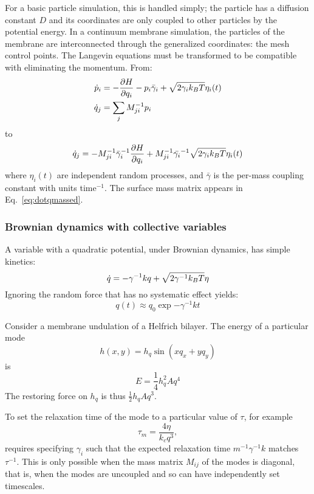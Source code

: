 For a basic particle simulation, this is handled simply; the particle has a diffusion constant $D$ and its coordinates are only coupled to other particles by the potential energy.
In a continuum membrane simulation, the particles of the membrane are interconnected through the generalized coordinates: the mesh control points.
The Langevin equations must be transformed to be compatible with eliminating the momentum.
From:
\begin{align}
\dot{p}_i &= -\frac{\partial H}{\partial q_i} -p_i \bar{\gamma}_i + \sqrt{2 \gamma_i k_B T} \eta_i(t) \nonumber \\
\dot{q}_j &= \sum_j M_{ji}^{-1} p_i
\end{align}
to
\begin{equation}
\dot{q}_j = -M_{ji}^{-1} \bar{\gamma}_i^{-1} \frac{\partial H}{\partial q_i} + M_{ji}^{-1}\bar{\gamma_i}^{-1}\sqrt{2 \gamma_i k_B T}\eta_i(t)
\label{eq:dotqmassed}
\end{equation}
where $\eta_i(t)$ are independent random processes, and $\bar{\gamma}$ is the per-mass coupling constant with units time$^{-1}$.
The surface mass matrix appears in Eq.~\ref{eq:dotqmassed}. 



\subsubsection{Brownian dynamics with collective variables}


A variable with a quadratic potential, under Brownian dynamics, has simple kinetics:
\begin{equation}
\dot{q} = -\gamma^{-1} k q + \sqrt{ 2 \gamma^{-1} k_B T } \eta
\end{equation}
Ignoring the random force that has no systematic effect yields:
\begin{equation}
q(t) \approx q_0 \exp{-\gamma^{-1} k t}
\end{equation}

Consider a membrane undulation of a Helfrich bilayer.
The energy of a particular mode
\begin{equation}
h(x,y) = h_q \sin(x q_x + y q_y )
\end{equation}
is
\begin{equation}
E = \frac{1}{4} h_q^2 A q^4
\end{equation}
The restoring force on $h_q$ is thus $\frac{1}{2} h_q A q^3$.

To set the relaxation time of the mode to a particular value of $\tau$, for example
\begin{equation}
\tau_m = \frac{4 \eta}{k_c q^3},
\end{equation}
requires specifying $\gamma_i$ such that the expected relaxation time $m^{-1} \gamma^{-1} k$ matches $\tau^{-1}$.
This is only possible when the mass matrix $M_{ij}$ of the modes is diagonal, that is, when the modes are uncoupled and so can have independently set timescales.











